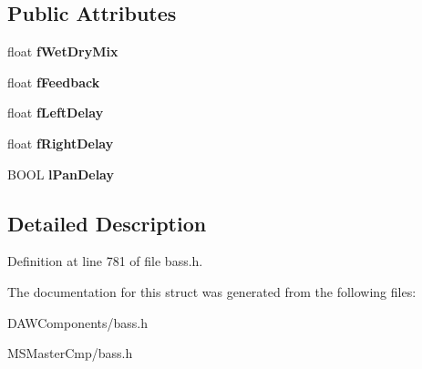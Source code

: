 \subsection*{Public Attributes}
\begin{DoxyCompactItemize}
\item 
\hypertarget{struct_b_a_s_s___d_x8___e_c_h_o_a6c2c28866ef373a669f059f335b6e0f6_a6c2c28866ef373a669f059f335b6e0f6}{float {\bfseries f\-Wet\-Dry\-Mix}}\label{struct_b_a_s_s___d_x8___e_c_h_o_a6c2c28866ef373a669f059f335b6e0f6_a6c2c28866ef373a669f059f335b6e0f6}

\item 
\hypertarget{struct_b_a_s_s___d_x8___e_c_h_o_af0b5c7c7657e2c96594f328f4e864949_af0b5c7c7657e2c96594f328f4e864949}{float {\bfseries f\-Feedback}}\label{struct_b_a_s_s___d_x8___e_c_h_o_af0b5c7c7657e2c96594f328f4e864949_af0b5c7c7657e2c96594f328f4e864949}

\item 
\hypertarget{struct_b_a_s_s___d_x8___e_c_h_o_a191fa91199c5fe5577e01f245cc9eee9_a191fa91199c5fe5577e01f245cc9eee9}{float {\bfseries f\-Left\-Delay}}\label{struct_b_a_s_s___d_x8___e_c_h_o_a191fa91199c5fe5577e01f245cc9eee9_a191fa91199c5fe5577e01f245cc9eee9}

\item 
\hypertarget{struct_b_a_s_s___d_x8___e_c_h_o_a75637c3dcdc3336ff8b6a5dd119af276_a75637c3dcdc3336ff8b6a5dd119af276}{float {\bfseries f\-Right\-Delay}}\label{struct_b_a_s_s___d_x8___e_c_h_o_a75637c3dcdc3336ff8b6a5dd119af276_a75637c3dcdc3336ff8b6a5dd119af276}

\item 
\hypertarget{struct_b_a_s_s___d_x8___e_c_h_o_a60032ed3f9846743ae53468309006a39_a60032ed3f9846743ae53468309006a39}{B\-O\-O\-L {\bfseries l\-Pan\-Delay}}\label{struct_b_a_s_s___d_x8___e_c_h_o_a60032ed3f9846743ae53468309006a39_a60032ed3f9846743ae53468309006a39}

\end{DoxyCompactItemize}


\subsection{Detailed Description}


Definition at line 781 of file bass.\-h.



The documentation for this struct was generated from the following files\-:\begin{DoxyCompactItemize}
\item 
D\-A\-W\-Components/bass.\-h\item 
M\-S\-Master\-Cmp/bass.\-h\end{DoxyCompactItemize}
